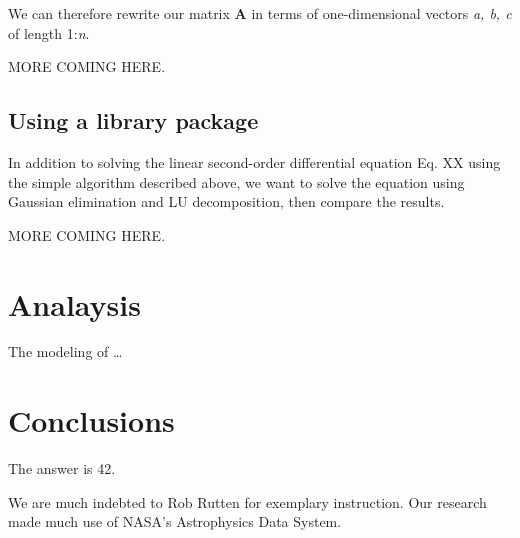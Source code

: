\documentclass{aa}
\begin{document}
\noindent We can therefore rewrite our matrix \textbf{A} in terms of one-dimensional vectors \textit{a, b, c} of length 1:\textit{n}.

MORE COMING HERE.



\subsection{Using a library package}
In addition to solving the linear second-order differential equation Eq. XX using the simple algorithm described above, we want to solve the equation using Gaussian elimination and LU decomposition, then compare the results.

MORE COMING HERE.



\section{Analaysis}    \label{sec:analysis}
The modeling of \dots


\section{Conclusions} \label{sec:conclusions}
The answer is 42.



\begin{acknowledgements}
  We are much indebted to Rob Rutten for exemplary instruction.
  Our research made much use of NASA's Astrophysics Data System.
\end{acknowledgements}



\end{document}
